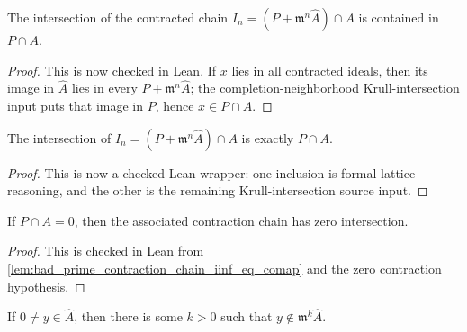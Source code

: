 \begin{lemma}
  \label{lem:bad_prime_contraction_chain_iinf_le_comap}
  The intersection of the contracted chain
  \(I_n=(P+\mathfrak m^n\widehat A)\cap A\) is contained in \(P\cap A\).
\end{lemma}

\begin{proof}
  This is now checked in Lean.  If \(x\) lies in all contracted ideals, then
  its image in \(\widehat A\) lies in every \(P+\mathfrak m^n\widehat A\);
  the completion-neighborhood Krull-intersection input puts that image in
  \(P\), hence \(x\in P\cap A\).
\end{proof}

\begin{lemma}
  \label{lem:bad_prime_contraction_chain_iinf_eq_comap}
  The intersection of \(I_n=(P+\mathfrak m^n\widehat A)\cap A\) is exactly
  \(P\cap A\).
\end{lemma}

\begin{proof}
  This is now a checked Lean wrapper: one inclusion is formal lattice
  reasoning, and the other is the remaining Krull-intersection source input.
\end{proof}

\begin{lemma}
  \label{lem:bad_prime_contraction_chain_iinf_eq_bot}
  If \(P\cap A=0\), then the associated contraction chain has zero
  intersection.
\end{lemma}

\begin{proof}
  This is checked in Lean from
  \cref{lem:bad_prime_contraction_chain_iinf_eq_comap} and the zero
  contraction hypothesis.
\end{proof}

\begin{lemma}
  \label{lem:adic_completion_nonzero_not_mem_power_image}
  If \(0\ne y\in\widehat A\), then there is some \(k>0\) such that
  \(y\notin \mathfrak m^k\widehat A\).
\end{lemma}

